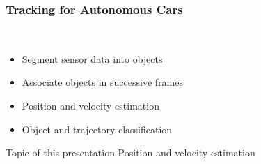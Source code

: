 \begin{frame}
  \frametitle{Tracking for Autonomous Cars}
  \begin{description}[]
  \item[Subtasks of Tracking] \hfill \\
  \begin{itemize}
  \item Segment sensor data into objects
  \item Associate objects in successive frames
  \item Position and velocity estimation
  \item Object and trajectory classification
  \end{itemize}
  \end{description}
  
  \begin{block}{Topic of this presentation}
    Position and velocity estimation
  \end{block}
\end{frame}

